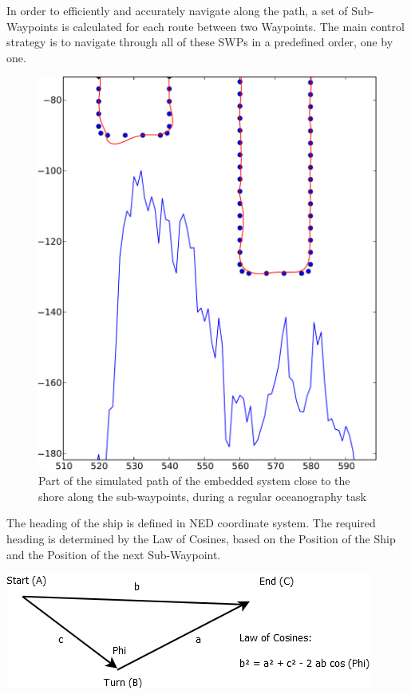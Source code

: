 In order to efficiently and accurately navigate along the path, a set of Sub-Waypoints is calculated for each route between two Waypoints. The main control strategy is to navigate through all of these SWPs in a predefined order, one by one.
\begin{figure}
	\begin{center}
		\includegraphics[width=\textwidth]{img/ControlStrategyFigures/Navi}    %
		\caption{Part of the simulated path of the embedded system close to the shore along the sub-waypoints, during a regular oceanography task}  %
		\label{fig:3points}               
	\end{center}                                 %
\end{figure}
The heading of the ship is defined in NED coordinate system. The required heading is determined by the Law of Cosines, based on the Position of the Ship and the Position of the next Sub-Waypoint.
\begin{center}
\includegraphics[scale = 0.4]{img/ControlStrategyFigures/Law_of_Cosines.png}
\end{center}
